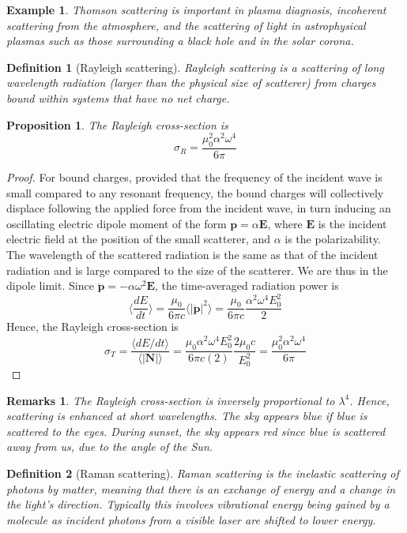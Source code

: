 \documentclass[a4paper]{article}
\newtheorem{remarks}{Remarks}[section]
\newtheorem{eg}{Example}[section]
\theoremstyle{new}
\newtheorem{defi}{Definition}[section]
\newtheorem{prop}{Proposition}[section]
\begin{document}
\begin{eg}
Thomson scattering is important in plasma diagnosis, incoherent scattering from the atmosphere, and the scattering of light in astrophysical plasmas such as those surrounding a black hole and in the solar corona.
\end{eg}
\begin{defi}[Rayleigh scattering]
Rayleigh scattering is a scattering of long wavelength radiation (larger than the physical size of scatterer) from charges bound within systems that have no net charge. 
\end{defi}
\begin{prop}
The Rayleigh cross-section is
$$\sigma_R=\frac{\mu_0^2\alpha^2\omega^4}{6\pi}$$
\end{prop}
\begin{proof}
For bound charges, provided that the frequency of the incident wave is small compared to any resonant frequency, the bound charges will collectively displace following the applied force from the incident wave, in turn inducing an oscillating electric dipole moment of the form $\mathbf{p}=\alpha\mathbf{E}$, where $\mathbf{E}$ is the incident electric field at the position of the small scatterer, and $\alpha$ is the polarizability.\\[5pt]
The wavelength of the scattered radiation is the same as that of the incident radiation and is large compared to the size of the scatterer. We are thus in the dipole limit. Since $\mathbf{\ddot{p}}=-\alpha\omega^2\mathbf{E}$, the time-averaged radiation power is
$$\bigg\langle\frac{dE}{dt}\bigg\rangle=\frac{\mu_0}{6\pi c}\langle|\mathbf{\ddot{p}}|^2\rangle=\frac{\mu_0}{6\pi c}\frac{\alpha^2\omega^4E_0^2}{2}$$
Hence, the Rayleigh cross-section is
$$\sigma_T=\frac{\langle dE/dt\rangle}{\langle|\mathbf{N}|\rangle}=\frac{\mu_0\alpha^2\omega^4E_0^2}{6\pi c(2)}\frac{2\mu_0c}{E_0^2}=\frac{\mu_0^2\alpha^2\omega^4}{6\pi}$$
\end{proof}
\begin{remarks}
The Rayleigh cross-section is inversely proportional to $\lambda^4$. Hence, scattering is enhanced at short wavelengths. The sky appears blue if blue is scattered to the eyes. During sunset, the sky appears red since blue is scattered away from us, due to the angle of the Sun.
\end{remarks}
\begin{defi}[Raman scattering]
Raman scattering is the inelastic scattering of photons by matter, meaning that there is an exchange of energy and a change in the light's direction. Typically this involves vibrational energy being gained by a molecule as incident photons from a visible laser are shifted to lower energy.
\end{defi}
\end{document}

